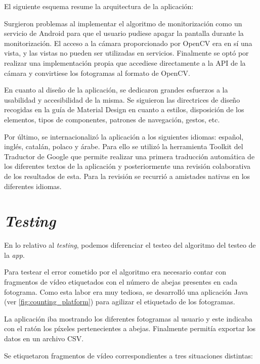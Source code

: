 El siguiente esquema resume la arquitectura de la aplicación:


Surgieron problemas al implementar el algoritmo de monitorización como
un servicio de Android para que el usuario pudiese apagar la pantalla
durante la monitorización. El acceso a la cámara proporcionado por
OpenCV era en sí una vista, y las vistas no pueden ser utilizadas en
servicios. Finalmente se optó por realizar una implementación propia que
accediese directamente a la API de la cámara y convirtiese los
fotogramas al formato de OpenCV.

En cuanto al diseño de la aplicación, se dedicaron grandes esfuerzos a
la usabilidad y accesibilidad de la misma. Se siguieron las directrices
de diseño recogidas en la guía de Material Design en cuanto a estilos,
disposición de los elementos, tipos de componentes, patrones de
navegación, gestos, etc.

Por último, se internacionalizó la aplicación a los siguientes idiomas:
español, inglés, catalán, polaco y árabe. Para ello se utilizó la
herramienta Toolkit del Traductor de Google que permite realizar una
primera traducción automática de los diferentes textos de la aplicación
y posteriormente una revisión colaborativa de los resultados de esta.
Para la revisión se recurrió a amistades nativas en los diferentes
idiomas.

\section{\emph{Testing}}\label{testing}

En lo relativo al \emph{testing}, podemos diferenciar el testeo del
algoritmo del testeo de la \emph{app}.

Para testear el error cometido por el algoritmo era necesario contar con
fragmentos de vídeo etiquetados con el número de abejas presentes en
cada fotograma. Como esta labor era muy tediosa, se desarrolló una
aplicación Java (ver \ref{fig:counting_platform}) para agilizar 
el etiquetado de los fotogramas.

La aplicación iba mostrando los diferentes fotogramas al usuario y este
indicaba con el ratón los píxeles pertenecientes a abejas. Finalmente
permitía exportar los datos en un archivo CSV.


Se etiquetaron fragmentos de vídeo correspondientes a tres situaciones
distintas:

